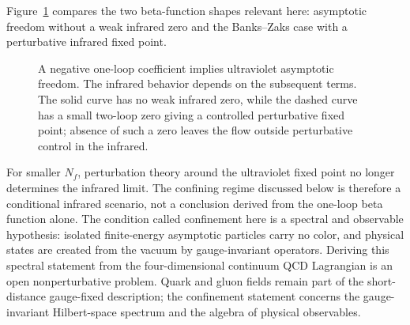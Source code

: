 Figure~\ref{fig:qcd-banks-zaks-beta-shapes} compares the two beta-function
shapes relevant here: asymptotic freedom without a weak infrared zero and the
Banks--Zaks case with a perturbative infrared fixed point.

\begin{figure}[H]
  \centering
  \caption{A negative one-loop coefficient implies ultraviolet asymptotic
  freedom.  The infrared behavior depends on the subsequent terms.  The solid
  curve has no weak infrared zero, while the dashed curve has a small two-loop
  zero giving a controlled perturbative fixed point; absence of such a zero
  leaves the flow outside perturbative control in the infrared.}
  \label{fig:qcd-banks-zaks-beta-shapes}
\end{figure}

For smaller \(N_f\), perturbation theory around the ultraviolet fixed point no
longer determines the infrared limit.  The confining regime discussed below is
therefore a conditional infrared scenario, not a conclusion derived from the
one-loop beta function alone.  The condition called confinement here is a
spectral and observable hypothesis: isolated finite-energy asymptotic
particles carry no color, and physical states are created from the vacuum by
gauge-invariant operators.  Deriving this spectral statement from the
four-dimensional continuum QCD Lagrangian is an open nonperturbative problem.
Quark and gluon fields remain part of the short-distance gauge-fixed
description; the confinement statement concerns the gauge-invariant
Hilbert-space spectrum and the algebra of physical observables.

